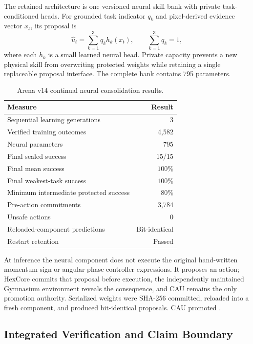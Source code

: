 The retained architecture is one versioned neural skill bank with private
task-conditioned heads.  For grounded task indicator $q_k$ and pixel-derived
evidence vector $x_t$, its proposal is
\begin{equation}
 \hat{u}_t
 =\sum_{k=1}^{3}q_k h_k(x_t),
 \qquad \sum_{k=1}^{3}q_k=1,
\end{equation}
where each $h_k$ is a small learned neural head.  Private capacity prevents a
new physical skill from overwriting protected weights while retaining a single
replaceable proposal interface.  The complete bank contains 795 parameters.

\begin{table}[htbp]
\centering
\caption{Arena v14 continual neural consolidation results.}
\label{tab:arena-v14-results}
\begin{tabular}{lr}
\hline
Measure & Result \\
\hline
Sequential learning generations & 3 \\
Verified training outcomes & 4,582 \\
Neural parameters & 795 \\
Final sealed success & 15/15 \\
Final mean success & $100\%$ \\
Final weakest-task success & $100\%$ \\
Minimum intermediate protected success & $80\%$ \\
Pre-action commitments & 3,784 \\
Unsafe actions & 0 \\
Reloaded-component predictions & Bit-identical \\
Restart retention & Passed \\
\hline
\end{tabular}
\end{table}

At inference the neural component does not execute the original hand-written
momentum-sign or angular-phase controller expressions.  It proposes an action;
HexCore commits that proposal before execution, the independently maintained
Gymnasium environment reveals the consequence, and CAU remains the only
promotion authority.  Serialized weights were SHA-256 committed, reloaded into
a fresh component, and produced bit-identical proposals.  CAU promoted
.

\subsection{Integrated Verification and Claim Boundary}

